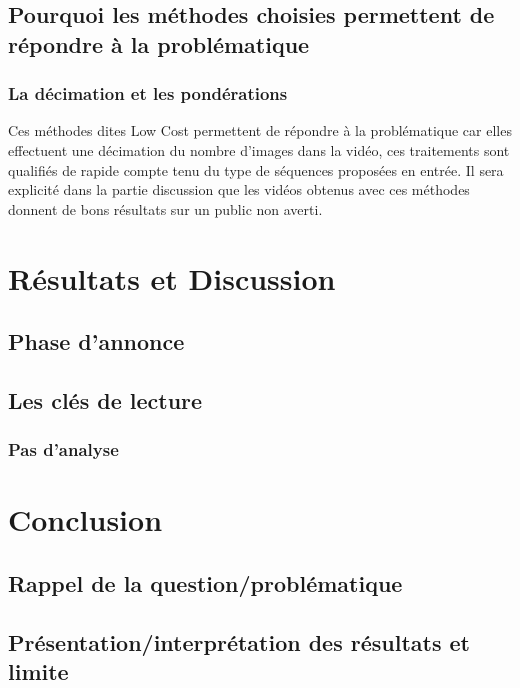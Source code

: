 \documentclass[fleqn,10pt]{SelfArx} %
\begin{document}
\subsection{Pourquoi les méthodes choisies permettent de répondre à la problématique}

\subsubsection{La décimation et les pondérations}
Ces méthodes dites \og Low Cost \fg{} permettent de répondre à la problématique car elles effectuent une décimation du nombre d'images dans la vidéo, ces traitements sont qualifiés de rapide compte tenu du type de séquences proposées en entrée. Il sera explicité dans la partie discussion que les vidéos obtenus avec ces méthodes donnent de bons résultats sur un public non averti.

\section{Résultats et Discussion}

\subsection{Phase d'annonce}

\subsection{Les clés de lecture}

\subsubsection{Pas d'analyse}


\section{Conclusion}
\subsection{Rappel de la question/problématique}
\subsection{Présentation/interprétation des résultats et limite}
\end{document}
